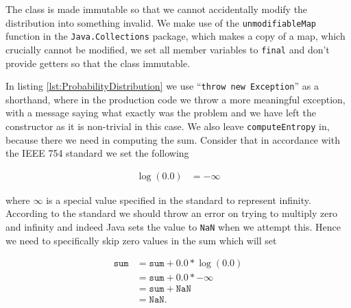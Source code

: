 \documentclass[12pt,twoside,notitlepage]{report}
\begin{document}
                The class is made immutable so that we cannot accidentally modify the distribution into something 
                invalid. We make use of the \texttt{unmodifiableMap} function in the \texttt{Java.Collections} package, 
                which makes a copy of a map, which crucially cannot be modified, we set all member variables to 
                \texttt{final} and don't provide getters so that the class immutable. 

                In listing \ref{lst:ProbabilityDistribution} we use ``\texttt{throw new Exception}'' as a shorthand, 
                where in the production code we throw a more meaningful exception, with a message saying what exactly 
                was the problem and we have left the constructor as it is non-trivial in this case. We also leave 
                \texttt{computeEntropy} in, because there we need in computing the sum. Consider that in accordance with the 
                IEEE 754 standard \cite{1985--ieee754} we set the following

                \begin{align}
                  \log(0.0) &= -\infty 
                \end{align}

                where $\infty$ is a special value specified in the standard to represent infinity. According to the 
                standard we should throw an error on trying to multiply zero and infinity and indeed Java sets the value 
                to \texttt{NaN} when we attempt this. Hence we need to specifically skip zero values in the sum which 
                will set

                \begin{align}
                  \texttt{sum} &= \texttt{sum} + 0.0 * \log(0.0) \\
                    &= \texttt{sum} + 0.0 * -\infty \\
                    &= \texttt{sum} + \texttt{NaN}\\
                    &= \texttt{NaN}.
                \end{align}
\end{document}
